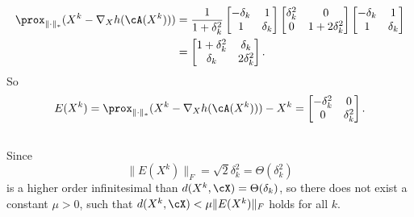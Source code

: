 \begin{equation}
\begin{split}
    \prox_{\|\cdot\|_*}(X^k-\nabla_X h(\cA(X^k)))
    &= \frac{1}{1+\delta_k^2}
    \begin{bmatrix}
        -\delta_k & 1 \\
        1  & \delta_k \\
    \end{bmatrix}
    \begin{bmatrix}
        \delta_k^2 & 0 \\
        0  & 1+2\delta_k^2 \\
    \end{bmatrix}
    \begin{bmatrix}
        -\delta_k & 1 \\
        1  & \delta_k \\
    \end{bmatrix} \\
    &=\begin{bmatrix}
        1+\delta_k^2 & \delta_k \\
        \delta_k  & 2\delta_k^2 \\
    \end{bmatrix}.
\end{split}
\end{equation}
So
\begin{equation}
    E(X^k) = \prox_{\|\cdot\|_*}(X^k-\nabla_X h(\cA(X^k))) - X^k =
    \begin{bmatrix}
        -\delta_k^2 & 0 \\
        0  & \delta_k^2 \\
    \end{bmatrix}. \\
\end{equation}

\subsection{} %

Since
\begin{equation}
    \|E(X^k)\|_F=\sqrt{2}\delta_k^2=\Theta(\delta_k^2)
\end{equation}
is a higher order infinitesimal than $d(X^k,\cX) = \Theta(\delta_k)$,
so there does not exist a constant $\mu>0$,
such that $d(X^k,\cX)<\mu \|E(X^k)\|_F$ holds for all $k$.

